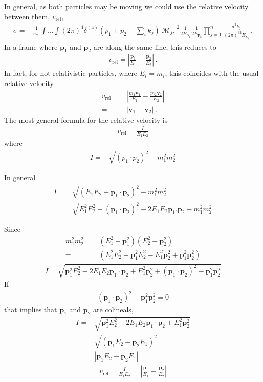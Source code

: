 In general, as both particles may be moving we could use the relative velocity between them, $v_{\text{rel}}$,
\begin{align}
   \sigma=&\frac{1}{v_{\text{rel}}}\int\ldots\int 
(2\pi)^4\delta^{(4)}\left(p_1+p_2-\sum_i k_j\right)
\left|\mathcal{M}_{fi}\right|^2
\frac{1}{2E_{\mathbf{p}_1}}\frac{1}{2E_{\mathbf{p}_2}}
\prod_{j=1}^n\frac{d^3k_j}{(2\pi)^32E_{\mathbf{k}_j}}\,.
\end{align}
In a frame where $\mathbf{p}_1$ and $\mathbf{p}_2$ are along the same line, this reduces to
\begin{align}
  v_{\text{rel}}=\left|
    \frac{\mathbf{p}_1}{E_1}-\frac{\mathbf{p}_2}{E_2}
  \right|\,.
\end{align}
In fact, for not relativistic particles, where $E_i=m_i$, this coincides with the usual relative velocity
\begin{align}
   v_{\text{rel}}=&\left|
    \frac{m_1\mathbf{v}_1}{E_1}-\frac{m_2\mathbf{v}_2}{E_2}
  \right|\nonumber\\
=&\left|
    \mathbf{v}_1-\mathbf{v}_2
  \right|\,.
\end{align}
The most general formula for the relative velocity is 
\begin{align}
  v_{\text{rel}}=\frac{I}{E_1E_2}
\end{align}
where
\begin{align}
  I=&\sqrt{(p_1\cdot p_2)^2-m_1^2m_2^2}  
\end{align}

In general
\begin{align}
  I=&\sqrt{(E_1 E_2-\mathbf{p}_1\cdot\mathbf{p}_2)^2-m_1^2m_2^2}\nonumber\\
  =&\sqrt{E_1^2E_2^2+(\mathbf{p}_1\cdot\mathbf{p}_2)^2-2E_1 E_2\mathbf{p}_1.\mathbf{p}_2 -m_1^2m_2^2}
\end{align}

Since
\begin{align}
  m_1^2m_2^2=&(E_1^2-\mathbf{p}_1^2)(E_2^2-\mathbf{p}_2^2)\nonumber\\
=&(E_1^2E_2^2-\mathbf{p}_1^2E_2^2-E_1^2\mathbf{p}_2^2+\mathbf{p}_1^2\mathbf{p}_2^2)
\end{align}
\begin{align}
  I=\sqrt{\mathbf{p}_1^2E_2^2-2E_1 E_2\mathbf{p}_1\cdot\mathbf{p}_2+E_1^2\mathbf{p}_2^2
+(\mathbf{p}_1\cdot\mathbf{p}_2)^2-
\mathbf{p}_1^2\mathbf{p}_2^2}
\end{align}
If
\begin{align}
  (\mathbf{p}_1\cdot\mathbf{p}_2)^2-
\mathbf{p}_1^2\mathbf{p}_2^2=0
\end{align}
that implies that $\mathbf{p}_1$ and $\mathbf{p}_2$ are colineals,
\begin{align}
  I=&\sqrt{\mathbf{p}_1^2E_2^2-2E_1 E_2\mathbf{p}_1\cdot\mathbf{p}_2+E_1^2\mathbf{p}_2^2}
  \nonumber\\
  =&\sqrt{(\mathbf{p}_1E_2-\mathbf{p}_2E_1)^2}\nonumber\\
  =&|\mathbf{p}_1E_2-\mathbf{p}_2E_1|
\end{align}
\begin{align}
\label{eq:53}
v_{\text{rel}}=  \frac{I}{E_1E_2}=\left|
    \frac{\mathbf{p}_1}{E_1}-\frac{\mathbf{p}_2}{E_2}
  \right|
\end{align}


